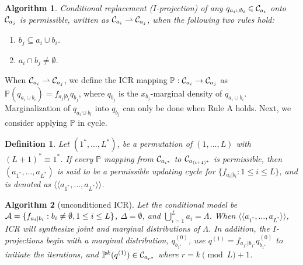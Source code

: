 \documentclass[12pt,a4paper]{article}
\newtheorem{definition}{Definition}
\newtheorem{alg}{Algorithm}
\begin{document}
\begin{alg}\label{alg:1}\rm
Conditional replacement ($I$-projection) of  any $q_{a_i \cup b_i} \in {\cal C}_{a_i}$ onto ${\cal C}_{a_j}$ is permissible, written as ${\cal C}_{a_i} \rightharpoonup {\cal C}_{a_j}$, when the following two rules hold:
\begin{enumerate}[\sf Rule A.]
\item $b_j \subseteq a_i \cup b_i$.
\item $a_i \cap b_j \ne \emptyset$.
\end{enumerate}
\end{alg}

When  ${\cal C}_{a_i} \rightharpoonup {\cal C}_{a_j}$, we define the ICR mapping ${\mathbb P}: {\cal C}_{a_i} \to {\cal C}_{a_j}$ as ${\mathbb P}(q_{a_i \cup b_i})= f_{a_j|b_j}q_{b_j}$, where
$q_{b_j}$ is the $x_{b_j}$-marginal density of $q_{a_i\cup b_i}$.
Marginalization of $q_{a_i \cup b_i}$ into $q_{b_j}$ can only be done when {\sf Rule A} holds.
Next, we consider applying ${\mathbb P}$ in cycle.
\begin{definition}
Let $(1^{\ast},\ldots, L^{\ast})$, be a permutation of $(1, \ldots,L)$ with $(L+1)^{\ast} \equiv 1^{\ast}$.  If every ${\mathbb P}$ mapping from  ${\cal C}_{a_{i^{\ast}}}$ to $ {\cal C}_{a_{(i+1)^{\ast}}}$ is permissible,
then $(a_{1^{\ast}},\ldots, a_{L^{\ast}})$ is said to be a permissible updating cycle for $\{f_{a_i|b_i}: 1 \le i \le L\}$, and is denoted as $\langle \langle a_{1^{\ast}},\ldots, a_{L^{\ast}} \rangle \rangle$.
\end{definition}

\begin{alg}[unconditioned ICR]\label{alg:2}\rm
Let the conditional model be ${\cal A}=\{ f_{a_i|b_i}: b_i \ne \emptyset, 1 \le i \le L\}$, $\Delta = \emptyset$, and $\bigcup_{i=1}^{L} a_i= \Lambda$.   When $\langle \langle a_{1^{\ast}},\ldots, a_{L^{\ast}}\rangle \rangle$,
ICR will synthesize joint and marginal distributions of ${\Lambda}$. %
In addition, the $I$-projections begin with a marginal distribution, $q^{(0)}_{b_{1^{\ast}}}$,  use $q^{(1)}=f_{a_{1^{\ast}}|b_{1^{\ast}}} q^{(0)}_{b_{1^{\ast}}}$ to initiate the iterations, and
${\mathbb P}^{k} (q^{(1)}) \in {\cal C}_{a_{r^{\ast}}}$ where $r=k\pmod L+1$.
\end{alg}
\end{document}
